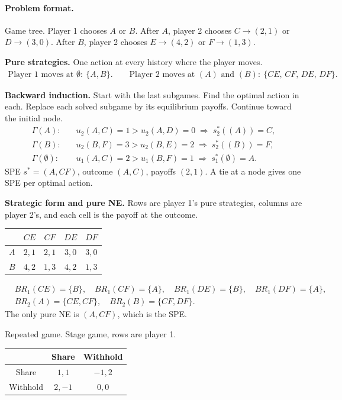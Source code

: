 \documentclass{article}
\begin{document}
\paragraph{Problem format.}
Game tree. Player 1 chooses $A$ or $B$. After $A$, player 2 chooses $C\to(2,1)$ or $D\to(3,0)$. After $B$, player 2 chooses $E\to(4,2)$ or $F\to(1,3)$.

\textbf{Pure strategies.} One action at every history where the player moves.
\begin{align*}
    \text{Player 1 moves at }\emptyset:\ \{A,B\}.\qquad \text{Player 2 moves at }(A)\text{ and }(B):\ \{CE,\,CF,\,DE,\,DF\}.
\end{align*}

\textbf{Backward induction.} Start with the last subgames. Find the optimal action in each. Replace each solved subgame by its equilibrium payoffs. Continue toward the initial node.
\begin{align*}
    \Gamma(A):&\quad u_2(A,C)=1>u_2(A,D)=0\;\Rightarrow\;s_2^*((A))=C,\\
    \Gamma(B):&\quad u_2(B,F)=3>u_2(B,E)=2\;\Rightarrow\;s_2^*((B))=F,\\
    \Gamma(\emptyset):&\quad u_1(A,C)=2>u_1(B,F)=1\;\Rightarrow\;s_1^*(\emptyset)=A.
\end{align*}
SPE $s^*=(A,CF)$, outcome $(A,C)$, payoffs $(2,1)$.
A tie at a node gives one SPE per optimal action.

\textbf{Strategic form and pure NE.} Rows are player 1's pure strategies, columns are player 2's, and each cell is the payoff at the outcome.
\begin{center}
\begin{tabular}{c|cccc}
 & $CE$ & $CF$ & $DE$ & $DF$ \\
\hline
$A$ & $2,1$ & $2,1$ & $3,0$ & $3,0$ \\
$B$ & $4,2$ & $1,3$ & $4,2$ & $1,3$ \\
\end{tabular}
\end{center}
\begin{align*}
    &BR_1(CE)=\{B\},\quad BR_1(CF)=\{A\},\quad BR_1(DE)=\{B\},\quad BR_1(DF)=\{A\},\\
    &BR_2(A)=\{CE,CF\},\quad BR_2(B)=\{CF,DF\}.
\end{align*}
The only pure NE is $(A,CF)$, which is the SPE.

Repeated game. Stage game, rows are player 1.
\begin{center}
\begin{tabular}{c|cc}
 & Share & Withhold \\
\hline
Share & $1,1$ & $-1,2$ \\
Withhold & $2,-1$ & $0,0$ \\
\end{tabular}
\end{center}
\end{document}

